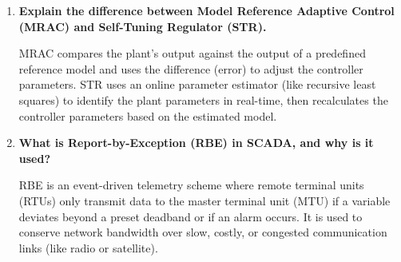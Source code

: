 \documentclass[12pt,a4paper]{article}
\newcommand{\Q}[1]{\textbf{#1}\par\noindent\ignorespaces}
\begin{document}
\begin{tcolorbox}[exambox, title={\textbf{Frequently Asked / Viva Questions}}]
\begin{enumerate}[leftmargin=*, itemsep=4pt]
  \item \Q{Explain the difference between Model Reference Adaptive Control (MRAC) and Self-Tuning Regulator (STR).}
    MRAC compares the plant's output against the output of a predefined reference model and uses the difference (error) to adjust the controller parameters. STR uses an online parameter estimator (like recursive least squares) to identify the plant parameters in real-time, then recalculates the controller parameters based on the estimated model.
  \item \Q{What is Report-by-Exception (RBE) in SCADA, and why is it used?}
    RBE is an event-driven telemetry scheme where remote terminal units (RTUs) only transmit data to the master terminal unit (MTU) if a variable deviates beyond a preset deadband or if an alarm occurs. It is used to conserve network bandwidth over slow, costly, or congested communication links (like radio or satellite).
\end{enumerate}
\end{tcolorbox}
\end{document}
